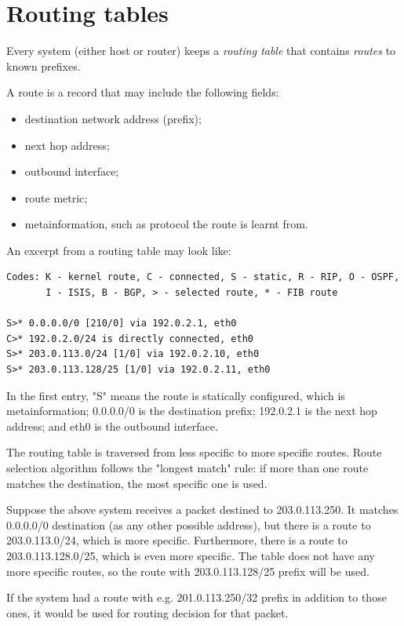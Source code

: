 \section{Routing tables}

Every system (either host or router) keeps a \emph{routing table} that contains \emph{routes} to known prefixes.

A route is a record that may include the following fields:
\begin{itemize}
  \item destination network address (prefix);
  \item next hop address;
  \item outbound interface;
  \item route metric;
  \item metainformation, such as protocol the route is learnt from.
\end{itemize}

An excerpt from a routing table may look like:
\begin{verbatim}
Codes: K - kernel route, C - connected, S - static, R - RIP, O - OSPF,
       I - ISIS, B - BGP, > - selected route, * - FIB route

S>* 0.0.0.0/0 [210/0] via 192.0.2.1, eth0
C>* 192.0.2.0/24 is directly connected, eth0
S>* 203.0.113.0/24 [1/0] via 192.0.2.10, eth0
S>* 203.0.113.128/25 [1/0] via 192.0.2.11, eth0
\end{verbatim}

In the first entry, "S" means the route is statically configured, which is metainformation;
0.0.0.0/0 is the destination prefix; 192.0.2.1 is the next hop address; and eth0 is the
outbound interface.

The routing table is traversed from less specific to more specific routes. Route selection
algorithm follows the "longest match" rule: if more than one route matches the destination,
the most specific one is used.

Suppose the above system receives a packet destined to 203.0.113.250. It matches 0.0.0.0/0
destination (as any other possible address), but there is a route to 203.0.113.0/24, which is
more specific. Furthermore, there is a route to 203.0.113.128.0/25, which is even more specific.
The table does not have any more specific routes, so the route with 203.0.113.128/25 prefix 
will be used.

If the system had a route with e.g. 201.0.113.250/32 prefix in addition to those ones, it would
be used for routing decision for that packet.



